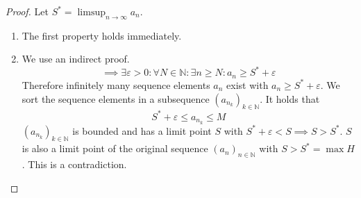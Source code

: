 \documentclass[a4paper,landscape,twocolumn]{article}
\theoremstyle{definition}
\newcommand\seq[1]{{\left(#1\right)}_{n \in \mathbb N}}
\begin{document}
\begin{proof}
  Let $S^* = \limsup_{n\to\infty} a_n$.
  \begin{enumerate}
    \item The first property holds immediately.
    \item
      We use an indirect proof.
      \[ \implies \exists \varepsilon > 0: \forall N \in \mathbb N: \exists n \geq N: a_n \geq S^* + \varepsilon \]
      Therefore infinitely many sequence elements $a_n$ exist with $a_n \geq S^* + \varepsilon$.
      We sort the sequence elements in a subsequence $\left(a_{n_k}\right)_{k \in \mathbb N}$.
      It holds that
      \[ S^* + \varepsilon \leq a_{n_k} \leq M \]
      $\left(a_{n_k}\right)_{k \in \mathbb N}$ is bounded and has a limit point $S$
      with $S^* + \varepsilon < S \implies S > S^*$.
      $S$ is also a limit point of the original sequence $\seq{a_n}$ with $S > S^* = \max{H}$.
      This is a contradiction.
  \end{enumerate}
\end{proof}
\end{document}
